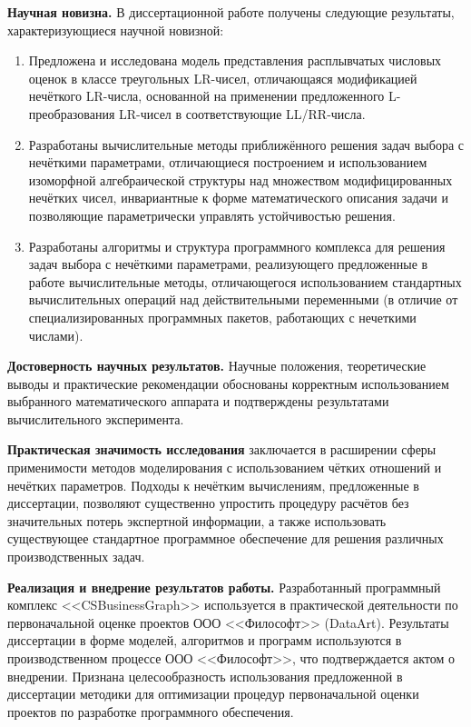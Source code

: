 \textbf{Научная новизна.} В диссертационной работе получены следующие результаты, характеризующиеся научной новизной:
\begin{enumerate}
  \item Предложена и исследована модель представления расплывчатых числовых оценок в классе треугольных LR-чисел, отличающаяся модификацией нечёткого LR-числа, основанной на применении предложенного L-преобразования LR-чисел в соответствующие LL/RR-числа.
  \item Разработаны вычислительные методы приближённого решения задач выбора с нечёткими параметрами, отличающиеся построением и использованием изоморфной алгебраической структуры над множеством модифицированных нечётких чисел, инвариантные к форме математического описания задачи и позволяющие параметрически управлять устойчивостью решения.
  \item Разработаны алгоритмы и структура программного комплекса для решения задач выбора с нечёткими параметрами, реализующего предложенные в работе вычислительные методы, отличающегося использованием стандартных вычислительных операций над действительными переменными (в отличие от специализированных программных пакетов, работающих с нечеткими числами).
\end{enumerate}

\textbf{Достоверность научных результатов.} Научные положения, теоретические выводы и практические рекомендации обоснованы корректным использованием выбранного математического аппарата и подтверждены результатами вычислительного эксперимента.

\textbf{Практическая значимость исследования} заключается в расширении сферы применимости методов моделирования с использованием чётких отношений и нечётких параметров. Подходы к нечётким вычислениям, предложенные в диссертации, позволяют существенно упростить процедуру расчётов без значительных потерь экспертной информации, а также использовать существующее стандартное программное обеспечение для решения различных производственных задач.

\textbf{Реализация и внедрение результатов работы.} Разработанный программный комплекс <<CSBusinessGraph>> используется в практической деятельности по первоначальной оценке проектов ООО <<Философт>> (DataArt). Результаты диссертации в форме моделей, алгоритмов и программ используются в производственном процессе ООО <<Философт>>, что подтверждается актом о внедрении. Признана целесообразность использования предложенной в диссертации методики для оптимизации процедур первоначальной оценки проектов по разработке программного обеспечения.

